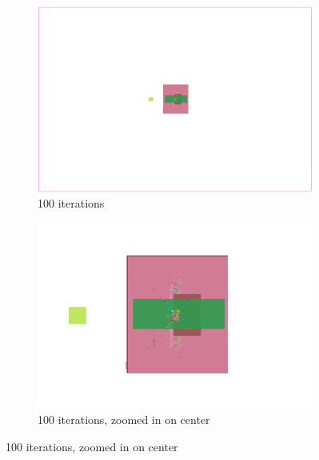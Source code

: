 \begin{figure}[p]
 \bigskip
 
 \begin{subfigure}{.48\textwidth}
  \includegraphics[width=\textwidth]{epsilon/placement_Chip1_100_iterations.png}
  \caption{100 iterations}
 \end{subfigure}
 \hfill
 \begin{subfigure}{.48\textwidth}
  \includegraphics[width=\textwidth, frame]{epsilon/placement_Chip1_100_iterations_zoomed.png}
  \caption{100 iterations, zoomed in on center}
 \end{subfigure}
 
 \bigskip
 

\end{figure}

